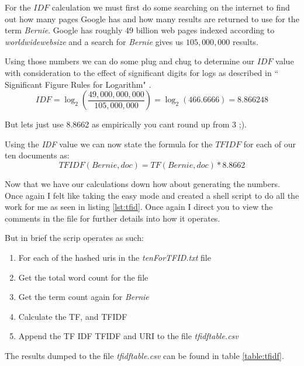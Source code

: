 \documentclass[letterpaper,10pt]{article}
\begin{document}
For the \(IDF\) calculation we must first do some searching on the internet to find out how many pages Google has and how many results are returned to use for the term \emph{Bernie}. Google has roughly 49 billion web pages indexed according to \emph{worldwidewebsize}  \cite{wwwsize} and a search for \emph{Bernie} gives us $105,000,000$ results. 


Using those numbers we can do some plug and chug to determine our \(IDF\) value with consideration to the effect of significant digits for logs as described in ``
Significant Figure Rules for Logarithm" \cite{sigdig}.
\[ IDF = \log_2 \left( \frac{49,000,000,000}{105,000,000} \right)  = \log_2 (466.6666) =  8.866248
\] 

But lets just use 8.8662 as empirically you cant round up from 3 ;).

Using the \emph{IDF} value we can now state the formula for the \(TFIDF\) for each of our ten documents as:
\[ TFIDF(Bernie,doc) = TF(Bernie,doc) * 8.8662\]



Now that we have our calculations down how about generating the numbers. Once again I felt like taking the easy mode and created a shell script to do all the work for me as seen in listing \ref{lst:tfid}. Once again I direct you to view the comments in the file for further details into how it operates.

But in brief the scrip operates as such:
\begin{enumerate}
\item For each of the hashed uris in the \emph{tenForTFID.txt} file
\item Get the total word count for the file
\item Get the term count again for \emph{Bernie}
\item Calculate the TF, and TFIDF
\item Append the TF IDF TFIDF and URI to the file \emph{tfidftable.csv}
\end{enumerate}

The results dumped to the file \emph{tfidftable.csv} can be found in table \ref{table:tfidf}.


\newpage

\end{document}
